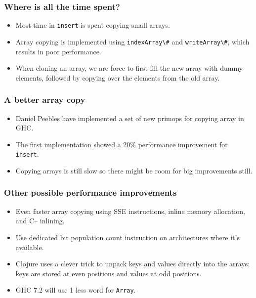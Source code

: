 \documentclass[xetex,mathserif,serif]{beamer}
\begin{document}
\begin{frame}
  \frametitle{Where is all the time spent?}

  \begin{itemize}
  \item Most time in \lstinline!insert! is spent copying small arrays.
  \item Array copying is implemented using \lstinline!indexArray\#!
    and \lstinline!writeArray\#!, which results in poor performance.
  \item When cloning an array, we are force to first fill the new
    array with dummy elements, followed by copying over the elements
    from the old array.
  \end{itemize}
\end{frame}

\begin{frame}
  \frametitle{A better array copy}

  \begin{itemize}
  \item Daniel Peebles have implemented a set of new primops for
    copying array in GHC.
  \item The first implementation showed a 20\% performance improvement
    for \lstinline!insert!.
  \item Copying arrays is still slow so there might be room for big
    improvements still.
  \end{itemize}
\end{frame}

\begin{frame}
  \frametitle{Other possible performance improvements}
  \begin{itemize}
  \item Even faster array copying using SSE instructions, inline
    memory allocation, and C-- inlining.
  \item Use dedicated bit population count instruction on
    architectures where it's available.
  \item Clojure uses a clever trick to unpack keys and values directly
    into the arrays; keys are stored at even positions and values at
    odd positions.
  \item GHC 7.2 will use 1 less word for \lstinline!Array!.
  \end{itemize}
\end{frame}
\end{document}
